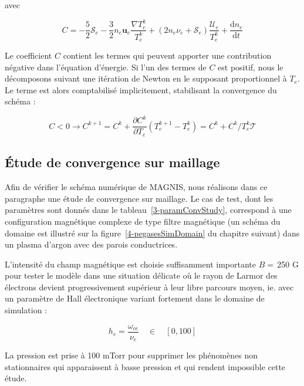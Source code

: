 \begin{refsection}
avec 

\begin{equation*}C=-\frac{5}{2}\mathcal S_e-\frac{3}{2}n_e\mathbf
u_e\frac{\nabla
T_e^k}{T_e^k}+(2n_e\nu_e+\mathcal{S}_e)\frac{\mathcal{U}_e}{T_e^k} +\frac{\text{d} n_e}{\text{d} t}
\end{equation*}

Le coefficient $C$ contient les termes qui peuvent apporter une contribution
négative dans l'équation d'énergie. Si l'un des
termes de $C$ est positif, nous le décomposons suivant une itération de
Newton en le supposant proportionnel à $T_e$. Le terme est alors comptabilisé
implicitement, stabilisant la convergence du schéma
\parencite{HagelaarImpl} :

\begin{equation*}
	C<0\rightarrow C^{k+1}=C^{k}+\frac{\partial C^k}{\partial
	T_e}(T_e^{k+1}-T_e^k)=C^{k}+ C^k/T_e^k\mathcal T
\end{equation*}

\subsection{Étude de convergence sur maillage} 
Afin de vérifier le schéma numérique de MAGNIS, nous réalisons dans ce
paragraphe une étude de convergence sur maillage. Le cas de test, dont les paramètres sont donnés dans le
tableau~\ref{3-paramConvStudy}, correspond à une configuration magnétique
complexe de type filtre magnétique (un schéma du domaine est illustré sur la
figure~\ref{4-pegasesSimDomain} du chapitre suivant) dans un plasma
d'argon avec des parois conductrices.

L'intensité du champ magnétique est choisie suffisamment importante $B=\,$250 G
pour tester le modèle dans une situation délicate où le rayon de Larmor des
électrons devient progressivement supérieur à leur libre parcours moyen, ie.
avec un paramètre de Hall électronique variant fortement dans le domaine de
simulation :

\begin{equation}
h_e=\frac{\omega_{ce}}{\nu_e}\quad\in\quad \left[0,100\right]
\end{equation}

La pression est prise à 100 mTorr pour supprimer les phénomènes non stationnaires qui apparaissent à basse
pression et qui rendent impossible cette étude. 


\end{refsection}

